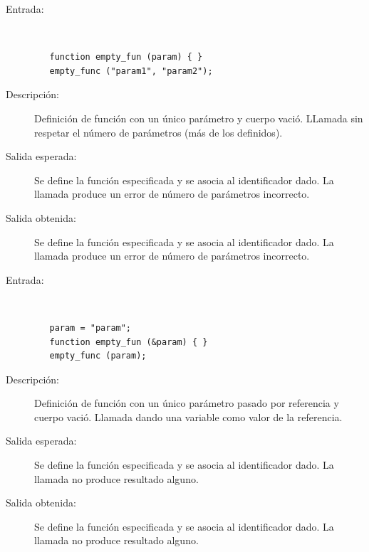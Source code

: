 \begin{framed}
	\begin{description}
		\item [Entrada:] \hfill \\
\begin{lstlisting}
   function empty_fun (param) { } 
   empty_func ("param1", "param2");
\end{lstlisting}
		\item [Descripción:] Definición de función con un único parámetro y cuerpo vació. LLamada sin respetar el número de parámetros (más de los definidos).
		\item [Salida esperada:] Se define la función especificada y se asocia al identificador dado. La llamada produce un error de número de parámetros incorrecto.
		\item [Salida obtenida:] Se define la función especificada y se asocia al identificador dado. La llamada produce un error de número de parámetros incorrecto.
	\end{description}
\end{framed}


\begin{framed}
	\begin{description}
		\item [Entrada:] \hfill \\
\begin{lstlisting}
   param = "param";
   function empty_fun (&param) { } 
   empty_func (param);
\end{lstlisting}
		\item [Descripción:] Definición de función con un único parámetro pasado por referencia y cuerpo vació. Llamada dando una variable como valor de la referencia.
		\item [Salida esperada:] Se define la función especificada y se asocia al identificador dado. La llamada no produce resultado alguno.
		\item [Salida obtenida:] Se define la función especificada y se asocia al identificador dado. La llamada no produce resultado alguno.
	\end{description}
\end{framed}

